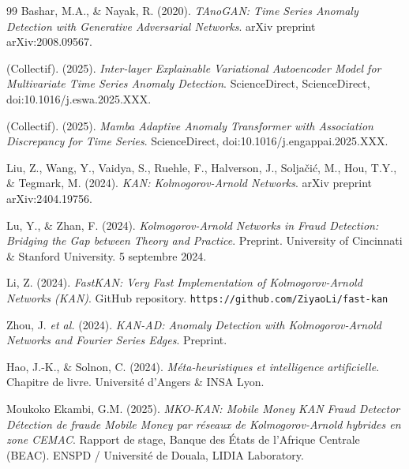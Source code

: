 \documentclass[12pt, a4paper]{article}
\begin{document}
\begin{thebibliography}{99}
Bashar, M.A., \& Nayak, R. (2020).
\textit{TAnoGAN: Time Series Anomaly Detection with Generative Adversarial
Networks}.
arXiv preprint arXiv:2008.09567.

(Collectif). (2025).
\textit{Inter-layer Explainable Variational Autoencoder Model for Multivariate
Time Series Anomaly Detection}.
ScienceDirect, ScienceDirect, doi:10.1016/j.eswa.2025.XXX.

(Collectif). (2025).
\textit{Mamba Adaptive Anomaly Transformer with Association Discrepancy
for Time Series}.
ScienceDirect, doi:10.1016/j.engappai.2025.XXX.

Liu, Z., Wang, Y., Vaidya, S., Ruehle, F., Halverson, J., Soljačić, M.,
Hou, T.Y., \& Tegmark, M. (2024).
\textit{KAN: Kolmogorov-Arnold Networks}.
arXiv preprint arXiv:2404.19756.

Lu, Y., \& Zhan, F. (2024).
\textit{Kolmogorov-Arnold Networks in Fraud Detection: Bridging the Gap
between Theory and Practice}.
Preprint. University of Cincinnati \& Stanford University.
5 septembre 2024.

Li, Z. (2024).
\textit{FastKAN: Very Fast Implementation of Kolmogorov-Arnold Networks
(KAN)}.
GitHub repository. \texttt{https://github.com/ZiyaoLi/fast-kan}

Zhou, J. \textit{et al.} (2024).
\textit{KAN-AD: Anomaly Detection with Kolmogorov-Arnold Networks and
Fourier Series Edges}.
Preprint.

Hao, J.-K., \& Solnon, C. (2024).
\textit{Méta-heuristiques et intelligence artificielle}.
Chapitre de livre. Université d'Angers \& INSA Lyon.

Moukoko Ekambi, G.M. (2025).
\textit{MKO-KAN: Mobile Money KAN Fraud Detector 
Détection de fraude Mobile Money par réseaux de Kolmogorov-Arnold hybrides
en zone CEMAC}.
Rapport de stage, Banque des États de l'Afrique Centrale (BEAC).
ENSPD / Université de Douala, LIDIA Laboratory.

\end{thebibliography}
\end{document}
